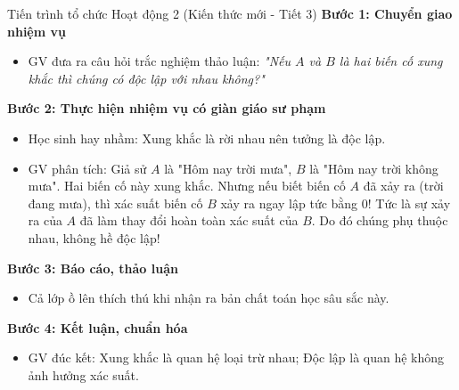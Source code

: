 \documentclass[12pt, a4paper]{article}
\begin{document}
\begin{pedabox}{Tiến trình tổ chức Hoạt động 2 (Kiến thức mới - Tiết 3)}
    \textbf{Bước 1: Chuyển giao nhiệm vụ}
    \begin{itemize}[leftmargin=0.6cm]
        \item GV đưa ra câu hỏi trắc nghiệm thảo luận: \textit{"Nếu $A$ và $B$ là hai biến cố xung khắc thì chúng có độc lập với nhau không?"}
    \end{itemize}

    \textbf{Bước 2: Thực hiện nhiệm vụ có giàn giáo sư phạm}
    \begin{itemize}[leftmargin=0.6cm]
        \item Học sinh hay nhầm: Xung khắc là rời nhau nên tưởng là độc lập.
        \item GV phân tích: Giả sử $A$ là "Hôm nay trời mưa", $B$ là "Hôm nay trời không mưa". Hai biến cố này xung khắc. Nhưng nếu biết biến cố $A$ đã xảy ra (trời đang mưa), thì xác suất biến cố $B$ xảy ra ngay lập tức bằng $0$! Tức là sự xảy ra của $A$ đã làm thay đổi hoàn toàn xác suất của $B$. Do đó chúng phụ thuộc nhau, không hề độc lập!
    \end{itemize}

    \textbf{Bước 3: Báo cáo, thảo luận}
    \begin{itemize}[leftmargin=0.6cm]
        \item Cả lớp ồ lên thích thú khi nhận ra bản chất toán học sâu sắc này.
    \end{itemize}

    \textbf{Bước 4: Kết luận, chuẩn hóa}
    \begin{itemize}[leftmargin=0.6cm]
        \item GV đúc kết: Xung khắc là quan hệ loại trừ nhau; Độc lập là quan hệ không ảnh hưởng xác suất.
    \end{itemize}
\end{pedabox}
\end{document}
